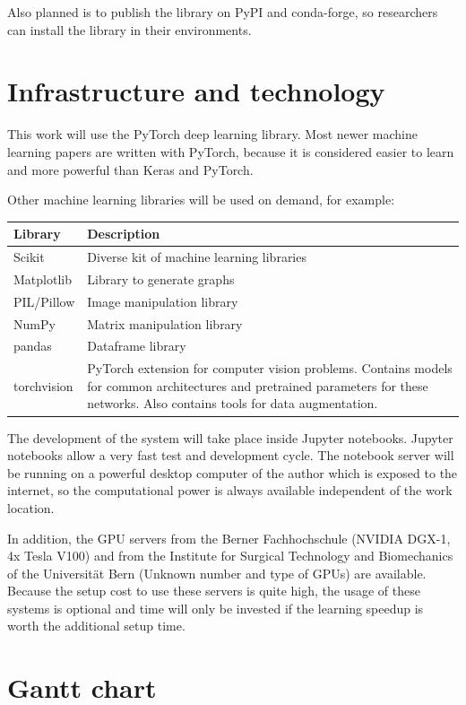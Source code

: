 Also planned is to publish the library on PyPI and conda-forge, so researchers can install the library in their environments.

\section{Infrastructure and technology}
This work will use the PyTorch\cite{paszke2017automatic} deep learning library. Most newer machine learning papers are written with PyTorch, because it is considered easier to learn and more powerful than Keras and PyTorch\cite{pytorchvstensorflow}.

Other machine learning libraries will be used on demand, for example:

\begin{tabular}{|p{3cm}|p{12.5cm}|}
    \hline
    \textbf{Library} & \textbf{Description} \\ \hline
    Scikit & Diverse kit of machine learning libraries \\ \hline
    Matplotlib & Library to generate graphs \\ \hline
    PIL/Pillow & Image manipulation library \\ \hline
    NumPy & Matrix manipulation library \\ \hline
    pandas & Dataframe library \\ \hline
    torchvision & PyTorch extension for computer vision problems. Contains models for common architectures and pretrained parameters for these networks. Also contains tools for data augmentation. \\ \hline
\end{tabular}

The development of the system will take place inside Jupyter notebooks. Jupyter notebooks allow a very fast test and development cycle. The notebook server will be running on a powerful desktop computer of the author which is exposed to the internet, so the computational power is always available independent of the work location.

In addition, the GPU servers from the Berner Fachhochschule (NVIDIA DGX-1, 4x Tesla V100) and from the Institute for Surgical Technology and Biomechanics of the Universität Bern (Unknown number and type of GPUs) are available. Because the setup cost to use these servers is quite high, the usage of these systems is optional and time will only be invested if the learning speedup is worth the additional setup time.

\section{Gantt chart}

